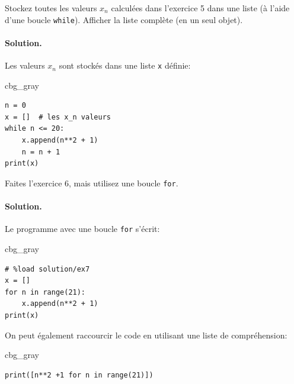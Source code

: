 \documentclass[%
oneside,                 %
final,                   %
10pt,french]{article}
\newenvironment{_cod_tight}[1]{
   \def\FrameCommand{\colorbox{#1}}
   \FrameRule0.6pt\MakeFramed {\FrameRestore}\vskip3mm}
   {\vskip0mm\endMakeFramed}
\newenvironment{cod}[1]{
\bgroup\rmfamily
\fboxsep=0mm\relax
\begin{_cod_tight}{#1}
\list{}{\parsep=-2mm\parskip=0mm\topsep=0pt\leftmargin=2mm
\rightmargin=2\leftmargin\leftmargin=4pt\relax}
\item\relax}
{\endlist\end{_cod_tight}\egroup}
\newenvironment{doconceexercise}{}{}
\newcounter{doconceexercisecounter}
\begin{document}
\begin{doconceexercise}



Stockez toutes les valeurs $x_n$ calculées dans l'exercice 5 dans une liste (à l'aide d'une boucle \texttt{while}). Afficher la liste complète (en un seul objet).


\paragraph{Solution.}
Les valeurs $x_n$ sont stockés dans une liste \texttt{x} définie:
\begin{cod}{cbg_gray}\begin{verbatim}
n = 0
x = []  # les x_n valeurs
while n <= 20:
    x.append(n**2 + 1)
    n = n + 1
print(x)
\end{verbatim}
\end{cod}
\noindent


\end{doconceexercise}




\begin{doconceexercise}



Faites l'exercice 6, mais utilisez une boucle \texttt{for}.


\paragraph{Solution.}
Le programme avec une boucle \texttt{for} s'écrit:
\begin{cod}{cbg_gray}\begin{verbatim}
# %load solution/ex7
x = []
for n in range(21):
    x.append(n**2 + 1)
print(x)
\end{verbatim}
\end{cod}
\noindent
On peut également raccourcir le code en utilisant une liste de compréhension:

\begin{cod}{cbg_gray}\begin{verbatim}
print([n**2 +1 for n in range(21)])
\end{verbatim}
\end{cod}
\noindent


\end{doconceexercise}
\end{document}
